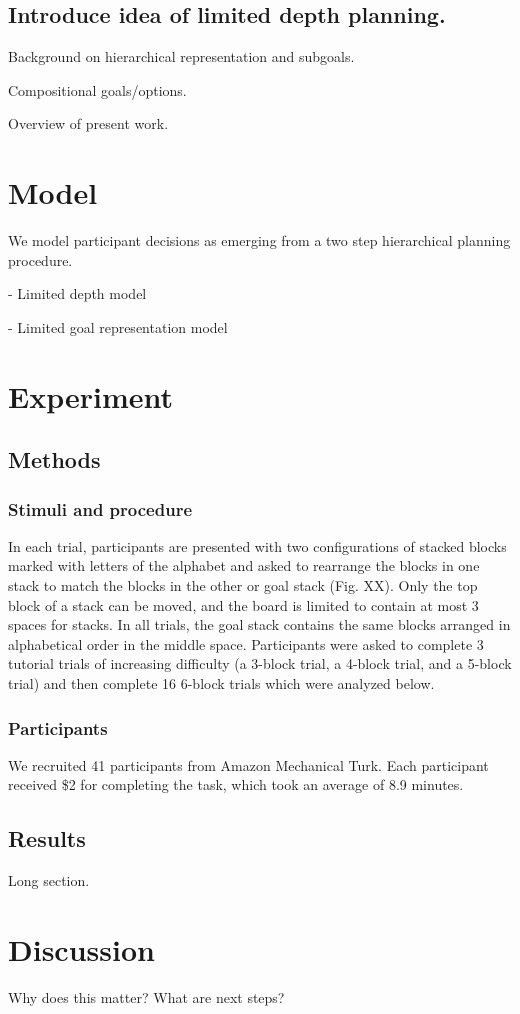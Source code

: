 \documentclass[10pt,letterpaper]{article}
\begin{document}
\subsection{Introduce idea of limited depth planning.}

Background on hierarchical representation and subgoals.

Compositional goals/options.

Overview of present work.


\section{Model}
We model participant decisions as emerging from a two step hierarchical planning procedure. 

- Limited depth model

- Limited goal representation model



\section{Experiment}

\subsection{Methods}
\subsubsection{Stimuli and procedure}

In each trial, participants are presented with two configurations of stacked blocks marked with letters of the alphabet and asked to rearrange the blocks in one stack to match the blocks in the other or goal stack (Fig. XX). Only the top block of a stack can be moved, and the board is limited to contain at most 3 spaces for stacks. In all trials, the goal stack contains the same blocks arranged in alphabetical order in the middle space. Participants were asked to complete 3 tutorial trials of increasing difficulty (a 3-block trial, a 4-block trial, and a 5-block trial) and then complete 16 6-block trials which were analyzed below.

\subsubsection{Participants}
We recruited 41 participants from Amazon Mechanical Turk. Each participant received \$2 for completing the task, which took an average of 8.9 minutes.

\subsection{Results}
Long section.


\section{Discussion}
Why does this matter? What are next steps?



\setlength{\bibleftmargin}{.125in}
\setlength{\bibindent}{-\bibleftmargin}


\end{document}
